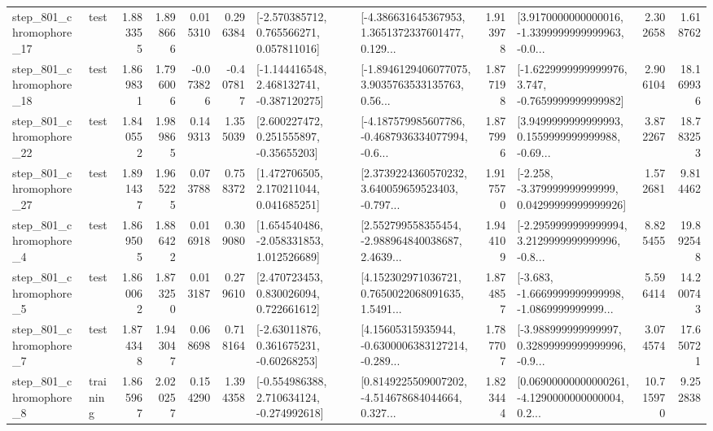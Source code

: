 \begin{tabular}{llrrrrllrlrr}
  step\_801\_chromophore\_17 &      test &      1.883355 &    1.898666 &      0.015310 &  0.296384 &    [-2.570385712, 0.765566271, 0.057811016] &  [-4.386631645367953, 1.3651372337601477, 0.129... &       1.913978 &  [3.9170000000000016, -1.3399999999999963, -0.0... &            2.302658 &          1.618762 \\
  step\_801\_chromophore\_18 &      test &      1.869831 &    1.796006 &     -0.073826 & -0.407817 &   [-1.144416548, 2.468132741, -0.387120275] &  [-1.8946129406077075, 3.9035763533135763, 0.56... &       1.877198 &  [-1.6229999999999976, 3.747, -0.7659999999999982] &            2.906104 &         18.169936 \\
  step\_801\_chromophore\_22 &      test &      1.840552 &    1.989865 &      0.149313 &  1.355039 &     [2.600227472, 0.251555897, -0.35655203] &  [-4.187579985607786, -0.4687936334077994, -0.6... &       1.877996 &  [3.9499999999999993, 0.1559999999999988, -0.69... &            3.872267 &         18.783253 \\
  step\_801\_chromophore\_27 &      test &      1.891437 &    1.965225 &      0.073788 &  0.758372 &     [1.472706505, 2.170211044, 0.041685251] &  [2.3739224360570232, 3.640059659523403, -0.797... &       1.917570 &  [-2.258, -3.379999999999999, 0.04299999999999926] &            1.572681 &          9.814462 \\
   step\_801\_chromophore\_4 &      test &      1.869505 &    1.886422 &      0.016918 &  0.309080 &    [1.654540486, -2.058331853, 1.012526689] &  [2.552799558355454, -2.988964840038687, 2.4639... &       1.944109 &  [-2.2959999999999994, 3.2129999999999996, -0.8... &            8.825455 &         19.892548 \\
   step\_801\_chromophore\_5 &      test &      1.860062 &    1.873250 &      0.013187 &  0.279610 &     [2.470723453, 0.830026094, 0.722661612] &  [4.152302971036721, 0.7650022068091635, 1.5491... &       1.874857 &  [-3.683, -1.6669999999999998, -1.0869999999999... &            5.596414 &         14.200743 \\
   step\_801\_chromophore\_7 &      test &      1.874348 &    1.943047 &      0.068698 &  0.718164 &     [-2.63011876, 0.361675231, -0.60268253] &  [4.15605315935944, -0.6300006383127214, -0.289... &       1.787707 &  [-3.988999999999997, 0.32899999999999996, -0.9... &            3.074574 &         17.650721 \\
   step\_801\_chromophore\_8 &  training &      1.865967 &    2.020257 &      0.154290 &  1.394358 &   [-0.554986388, 2.710634124, -0.274992618] &  [0.8149225509007202, -4.514678684044664, 0.327... &       1.823444 &  [0.06900000000000261, -4.1290000000000004, 0.2... &           10.715970 &          9.252838 \\

\end{tabular}
